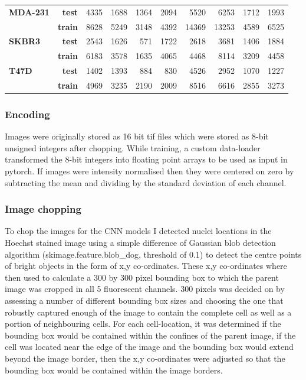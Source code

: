 \documentclass[a4paper,11pt,twoside,openright]{scrbook}
\begin{document}
\begin{table}[h]
\begin{tabular}{lrrrrrrrrr}
\textbf{MDA-231} & \textbf{test} &   4335 &   1688 &         1364 &   2094 &        5520 &        6253 &          1712 
&   1993 \\
        & \textbf{train} &   8628 &   5249 &         3148 &   4392 &       14369 &       13253 &          4589 &   6525 
\\
\textbf{SKBR3} & \textbf{test} &   2543 &   1626 &          571 &   1722 &        2618 &        3681 &          1406 &  
 1884 \\
        & \textbf{train} &   6183 &   3578 &         1635 &   4065 &        4468 &        8114 &          3209 &   4458 
\\
\textbf{T47D} & \textbf{test} &   1402 &   1393 &          884 &    830 &        4526 &        2952 &          1070 &   
1227 \\
        & \textbf{train} &   4969 &   3235 &         2190 &   2009 &        8516 &        6616 &          2855 &   3273 
\\
\bottomrule
\end{tabular}
\end{table}


\subsubsection{Encoding}

Images were originally stored as 16 bit tif files which were stored as 8-bit unsigned integers after chopping.
While training, a custom data-loader transformed the 8-bit integers into floating point arrays to be used as input in 
pytorch.
If images were intensity normalised then they were centered on zero by subtracting the mean and dividing by the 
standard deviation of each channel.


\subsubsection{Image chopping}

To chop the images for the CNN models I detected nuclei locations in the Hoechst stained image using a simple 
difference of Gaussian blob detection algorithm (skimage.feature.blob\_dog, threshold of 0.1) to detect the centre 
points of bright objects in the form of x,y co-ordinates.
These x,y co-ordinates where then used to calculate a 300 by 300 pixel bounding box to which the parent image was 
cropped in all 5 fluorescent channels.
300 pixels was decided on by assessing a number of different bounding box sizes and choosing the one that robustly 
captured enough of the image to contain the complete cell as well as a portion of neighbouring cells.
For each cell-location, it was determined if the bounding box would be contained within the confines of the parent 
image, if the cell was located near the edge of the image and the bounding box would extend beyond the image border, 
then the x,y co-ordinates were adjusted so that the bounding box would be contained within the image borders.
\end{document}
